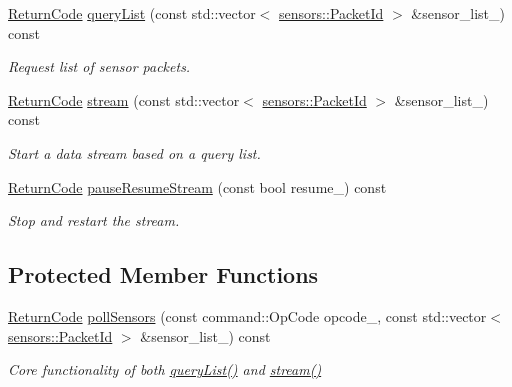 \begin{DoxyCompactItemize}
\hyperlink{classroomba_1_1series500_1_1oi_1_1_o_i_command_ab408b9562318caf292794d8ba335d5ed}{Return\+Code} \hyperlink{classroomba_1_1series500_1_1oi_1_1_o_i_command_a5bbd5bd27cbb3683f6bb2178bcf11da0}{query\+List} (const std\+::vector$<$ \hyperlink{namespaceroomba_1_1series500_1_1oi_1_1sensors_a909f47d40452d1cabb85eef642ac04b6}{sensors\+::\+Packet\+Id} $>$ \&sensor\+\_\+list\+\_\+) const 
\begin{DoxyCompactList}\small\item\em Request list of sensor packets. \end{DoxyCompactList}\item 
\hyperlink{classroomba_1_1series500_1_1oi_1_1_o_i_command_ab408b9562318caf292794d8ba335d5ed}{Return\+Code} \hyperlink{classroomba_1_1series500_1_1oi_1_1_o_i_command_af7588c4631e8878f127f1801e38e4866}{stream} (const std\+::vector$<$ \hyperlink{namespaceroomba_1_1series500_1_1oi_1_1sensors_a909f47d40452d1cabb85eef642ac04b6}{sensors\+::\+Packet\+Id} $>$ \&sensor\+\_\+list\+\_\+) const 
\begin{DoxyCompactList}\small\item\em Start a data stream based on a query list. \end{DoxyCompactList}\item 
\hyperlink{classroomba_1_1series500_1_1oi_1_1_o_i_command_ab408b9562318caf292794d8ba335d5ed}{Return\+Code} \hyperlink{classroomba_1_1series500_1_1oi_1_1_o_i_command_aeae9381621960add840e5ad9a6b4ab00}{pause\+Resume\+Stream} (const bool resume\+\_\+) const 
\begin{DoxyCompactList}\small\item\em Stop and restart the stream. \end{DoxyCompactList}\end{DoxyCompactItemize}
\subsection*{Protected Member Functions}
\begin{DoxyCompactItemize}
\item 
\hyperlink{classroomba_1_1series500_1_1oi_1_1_o_i_command_ab408b9562318caf292794d8ba335d5ed}{Return\+Code} \hyperlink{classroomba_1_1series500_1_1oi_1_1_o_i_command_ade5c0f0104d0340045067f29349548ac}{poll\+Sensors} (const command\+::\+Op\+Code opcode\+\_\+, const std\+::vector$<$ \hyperlink{namespaceroomba_1_1series500_1_1oi_1_1sensors_a909f47d40452d1cabb85eef642ac04b6}{sensors\+::\+Packet\+Id} $>$ \&sensor\+\_\+list\+\_\+) const 
\begin{DoxyCompactList}\small\item\em Core functionality of both \hyperlink{classroomba_1_1series500_1_1oi_1_1_o_i_command_a5bbd5bd27cbb3683f6bb2178bcf11da0}{query\+List()} and \hyperlink{classroomba_1_1series500_1_1oi_1_1_o_i_command_af7588c4631e8878f127f1801e38e4866}{stream()} \end{DoxyCompactList}\end{DoxyCompactItemize}
